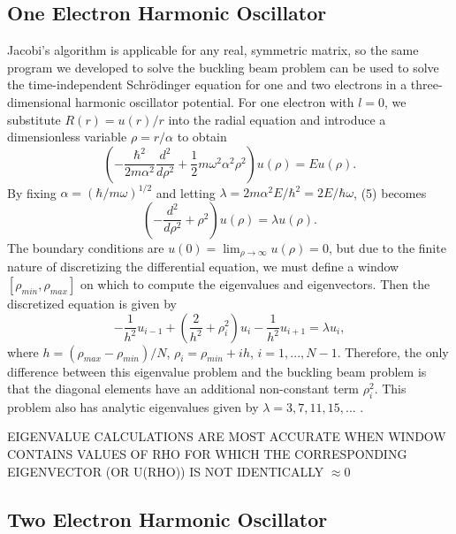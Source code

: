 \documentclass[prb,aps,twocolumn,showpacs,10pt]{revtex4-1}
\begin{document}
\subsection{One Electron Harmonic Oscillator}
Jacobi's algorithm is applicable for any real, symmetric matrix, so the same program we developed to solve the buckling beam problem can be used to solve the time-independent Schr{\"o}dinger equation for one and two electrons in a three-dimensional harmonic oscillator potential. For one electron with $l=0$, we substitute $R(r)=u(r)/r$ into the radial equation and introduce a dimensionless variable $\rho = r/\alpha$ to obtain
\begin{equation}
\left( -\frac{\hbar^2}{2m\alpha^2} \frac{d^2}{d\rho^2} + \frac{1}{2}m\omega^2\alpha^2\rho^2 \right) u(\rho) = E u(\rho). 
\end{equation}
By fixing $\alpha=(\hbar/m\omega)^{1/2}$ and letting $\lambda=2m\alpha^2 E/\hbar^2 = 2E/\hbar\omega$, (5) becomes 
\begin{equation}
\left( -\frac{d^2}{d\rho^2} + \rho^2 \right) u(\rho) = \lambda u(\rho).
\end{equation}
The boundary conditions are $u(0)=\lim_{\rho \rightarrow \infty} u(\rho)=0$, but due to the finite nature of discretizing the differential equation, we must define a window $[\rho_{min}, \rho_{max}]$ on which to compute the eigenvalues and eigenvectors. Then the discretized equation is given by
\begin{equation}
-\frac{1}{h^2} u_{i-1} + \left( \frac{2}{h^2} + \rho_i^2 \right) u_i -\frac{1}{h^2} u_{i+1} = \lambda u_i, 
\end{equation}
where $h=(\rho_{max}-\rho_{min})/N$, $\rho_i = \rho_{min} + ih$, $i = 1, ..., N-1$. Therefore, the only difference between this eigenvalue problem and the buckling beam problem is that the diagonal elements have an additional non-constant term $\rho_i^2$. This problem also has analytic eigenvalues given by $\lambda = 3, 7, 11, 15, ...$ .

EIGENVALUE CALCULATIONS ARE MOST ACCURATE WHEN WINDOW CONTAINS VALUES OF RHO FOR WHICH THE CORRESPONDING EIGENVECTOR (OR U(RHO)) IS NOT IDENTICALLY $\approx 0$

\subsection{Two Electron Harmonic Oscillator}
\end{document}
